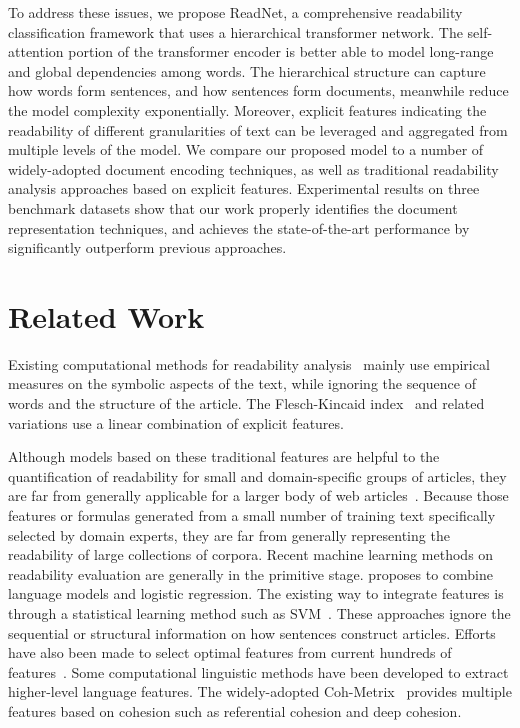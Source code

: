 \documentclass[runningheads]{llncs}
\begin{document}
To address these issues, we propose ReadNet, a comprehensive readability classification framework that uses a hierarchical transformer network. The self-attention portion of the transformer encoder is better able to model long-range and global dependencies among words. The hierarchical structure can capture how words form sentences, and how sentences form documents, meanwhile reduce the model complexity exponentially.
Moreover, explicit features indicating the readability of different granularities of text can be leveraged and aggregated from multiple levels of the model.
We compare our proposed model to a number of widely-adopted document encoding techniques,
as well as traditional readability analysis approaches based on explicit features.
Experimental results on three benchmark datasets show that our work properly identifies the document representation techniques,
and achieves the state-of-the-art performance by significantly outperform previous approaches. 










 \section{Related Work}\label{sec:related}
Existing computational methods for readability analysis~\cite{readability2,readability3,readability4,CollinsSurvey,pilan2016predicting} mainly use empirical measures on the symbolic aspects of the text, while ignoring the sequence of words and the structure of the article. The Flesch-Kincaid index~\cite{kincaid1975derivation} and related variations use a linear combination of explicit features.

Although models based on these traditional features are helpful to the quantification of readability for small and domain-specific groups of articles, they are far from generally applicable for a larger body of web articles~\cite{Si2001ASM,CollinsThompson2004ALM,Feng2009}. Because those features or formulas generated from a small number of training text specifically selected by domain experts, they are far from generally representing the readability of large collections of corpora. Recent machine learning methods on readability evaluation are generally in the primitive stage. \cite{franccois2009combining} proposes to combine language models and logistic regression. The existing way to integrate features is through a statistical learning method such as SVM~\cite{ReadingMeasures,SVM,collins2005predicting,pitler2008revisiting,pilan2016predicting,CambridgeData}. 
These approaches ignore the sequential or structural information on how sentences construct articles. Efforts have also been made to select optimal features from current hundreds of features~\cite{de2016all}. Some computational linguistic methods have been developed to extract higher-level language features. The widely-adopted Coh-Metrix~\cite{graesser2004coh,mcnamara2010coh} provides multiple features based on cohesion such as referential cohesion and deep cohesion.
\end{document}

